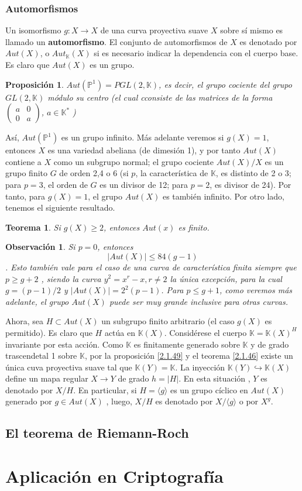 \documentclass[12pt,a4paper]{report}
\newcommand{\K}{\mathbb{K}}
\newtheorem{teo}{Teorema}[chapter]
\newtheorem{obs}{Observación}[chapter]
\newtheorem{prop}{Proposición}[chapter]
\begin{document}
\subsection{Automorfismos} 
Un isomorfismo $g:X \rightarrow X$ de una curva proyectiva suave $X$ sobre sí mismo es llamado un \textbf{automorfismo}. El conjunto de automorfismos de $X$ es denotado por $Aut(X)$, o $Aut_{\K}(X)$ si es  necesario indicar la dependencia  con el cuerpo base. Es claro que $Aut (X) $ es un grupo. 

\begin{prop}
	$Aut(\mathbb{P}^{1}) = PGL(2,\K)$, es decir, el grupo cociente del grupo $GL(2,\K)$ módulo su centro (el cual cconsiste de las matrices de la forma $ \left( \begin{array}{cc}
	a & 0 \\
	0 & a
	\end{array} \right) $, $a \in \K ^{*}$  )
\end{prop}

Así, $Aut(\mathbb{P}^{1})$ es un grupo infinito. Más adelante veremos si $g(X)=1$, entonces $X$ es una variedad abeliana (de dimesión 1), y por tanto $Aut (X)$ contiene a $X$ como un subgrupo normal; el grupo cociente $Aut(X) / X$ es un grupo finito $G$ de orden 2,4 o 6 (si $p$, la característica de $\K$, es distinto de 2 o 3; para $p=3$, el orden de $G$ es un divisor de 12; para $p=2$, es divisor de 24). Por tanto, para $g(X)=1$, el grupo $Aut(X)$ es también infinito. Por otro lado, tenemos el siguiente resultado.\\

\begin{teo}
	Si $g(X)\geq 2$, entonces $Aut(x)$ es finito.
\end{teo}

\begin{obs}
	Si $p=0$, entonces $$|Aut(X)| \leq 84 (g-1) $$. Esto también vale para el caso de una curva de característica finita siempre que $p \geq g+2$ , siendo la curva $y^{2}=x^{r}-x, r \neq 2$ la única excepción, para la cual $g=(p-1)/2$ y $|Aut(X)| = 2^{2}(p-1)$. Para $p \leq g+1$, como veremos más adelante, el grupo $Aut(X)$ puede ser muy grande inclusive para otras curvas.
\end{obs}

Ahora, sea $H \subset Aut(X)$ un subgrupo finito arbitrario (el caso $g(X)$ es permitido). Es claro que $H$ actúa en $\K(X)$. Considérese el cuerpo $ \K = \K (X)^{H}$ invariante por esta acción. Como $\K$ es finitamente generado sobre $\K$ y de grado trascendetal 1 sobre $\K$, por la proposición \ref{2.1.49} y el teorema \ref{2.1.46} existe un única cuva proyectiva suave  tal que $\K(Y) = \K$. La inyección $ \K(Y) \hookrightarrow \K(X)$ define un mapa regular $X \rightarrow Y$ de grado $h =|H|$. En esta situación , $Y$ es denotado por $X/H$. En particular, si $H= \langle g \rangle $ es un grupo cíclico en $Aut(X)$ generado por $g \in Aut (X)$ , luego, $X/H$ es denotado por $X/\langle g \rangle$ o por $ X^{g}$. 


\section{El teorema de Riemann-Roch}

\chapter{Aplicación en Criptografía}
\end{document}
